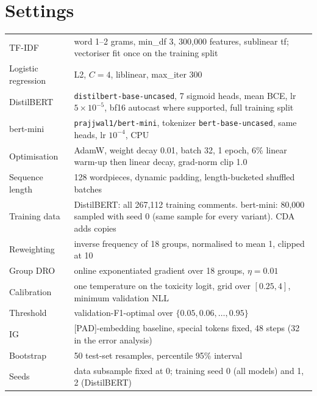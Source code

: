 \section{Settings}
\label{app:settings}
\begin{center}\small
\begin{tabular}{lp{}}\toprule
TF-IDF & word 1--2 grams, min\_df 3, 300{,}000 features, sublinear tf; vectoriser fit once on the training split \\
Logistic regression & L2, $C{=}4$, liblinear, max\_iter 300 \\
DistilBERT & \texttt{distilbert-base-uncased}, 7 sigmoid heads, mean BCE, lr $5{\times}10^{-5}$, bf16 autocast where supported, full training split \\
bert-mini & \texttt{prajjwal1/bert-mini}, tokenizer \texttt{bert-base-uncased}, same heads, lr $10^{-4}$, CPU \\
Optimisation & AdamW, weight decay 0.01, batch 32, 1 epoch, 6\% linear warm-up then linear decay, grad-norm clip 1.0 \\
Sequence length & 128 wordpieces, dynamic padding, length-bucketed shuffled batches \\
Training data & DistilBERT: all 267{,}112 training comments. bert-mini: 80{,}000 sampled with seed 0 (same sample for every variant). CDA adds copies \\
Reweighting & inverse frequency of 18 groups, normalised to mean 1, clipped at 10 \\
Group DRO & online exponentiated gradient over 18 groups, $\eta{=}0.01$ \\
Calibration & one temperature on the toxicity logit, grid over $[0.25, 4]$, minimum validation NLL \\
Threshold & validation-F1-optimal over $\{0.05, 0.06, \dots, 0.95\}$ \\
IG & [PAD]-embedding baseline, special tokens fixed, 48 steps (32 in the error analysis) \\
Bootstrap & 50 test-set resamples, percentile 95\% interval \\
Seeds & data subsample fixed at 0; training seed 0 (all models) and 1, 2 (DistilBERT) \\
\bottomrule\end{tabular}
\end{center}
